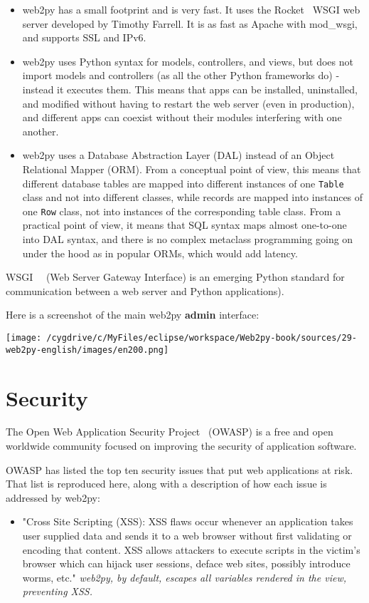 \documentclass[justified,sixbynine,notoc]{tufte-book}
\def\ft{\small\tt}
\def\inxx#1{\index{#1}}
\begin{document}
\begin{fullwidth}
\begin{itemize}
\item web2py has a small footprint and is very fast. It uses the Rocket~\cite{rocket}  WSGI web server developed by Timothy Farrell. It is as fast as Apache with mod\_wsgi, and supports SSL and IPv6.

\item web2py uses Python syntax for models, controllers, and views, but does not import models and controllers (as all the other Python frameworks do) - instead it executes them. This means that apps can be installed, uninstalled, and modified without having to restart the web server (even in production), and different apps can coexist without their modules interfering with one another.

\item web2py uses a Database Abstraction Layer (DAL) instead of an Object Relational Mapper (ORM). From a conceptual point of view, this means that different database tables are mapped into different instances of one {\ft Table} class and not into different classes, while records are mapped into instances of one {\ft Row} class, not into instances of the corresponding table class. From a practical point of view, it means that SQL syntax maps almost one-to-one into DAL syntax, and there is no complex metaclass programming going on under the hood as in popular ORMs, which would add latency.
\end{itemize}

WSGI~\cite{wsgi-w}~\cite{wsgi-o} (Web Server Gateway Interface) is an emerging Python standard for communication between a web server and Python applications).

Here is a screenshot of the main web2py {\bf admin} interface:


\goodbreak\begin{center}\texttt{[image: /cygdrive/c/MyFiles/eclipse/workspace/Web2py-book/sources/29-web2py-english/images/en200.png]}\end{center}


\goodbreak\section{Security}

\inxx{security}
The Open Web Application Security Project~\cite{owasp}  (OWASP) is a free and open worldwide community focused
on improving the security of application software.

OWASP has listed the top ten security issues that put web applications at risk.
That list is reproduced here, along with a description of how each issue is addressed by web2py:
\begin{itemize}
\item \inxx{cross site scripting}  "Cross Site Scripting (XSS): XSS flaws occur whenever an application takes user supplied data and sends it to a web browser without first validating or encoding that content. XSS allows attackers to execute scripts in the victim's browser which can hijack user sessions, deface web sites, possibly introduce worms, etc." {\it web2py, by default, escapes all variables rendered in the view, preventing XSS.}


\end{itemize}
\end{fullwidth}
\end{document}
